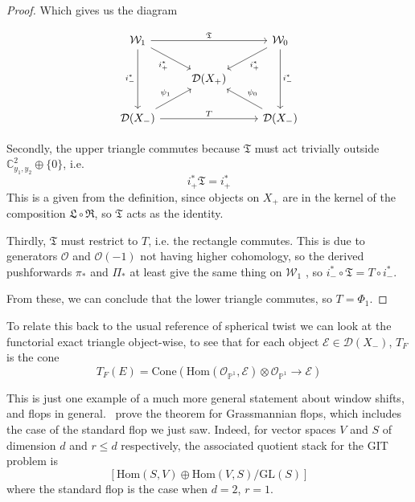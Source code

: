\begin{proof}
Which gives us the diagram

\[\begin{tikzcd}
	{\mathcal{W}_1} && {\mathcal{W}_0} \\
	& {\mathcal{D}(X_+ )} \\
	{\mathcal{D}(X_- )} && {\mathcal{D}(X_- )}
	\arrow["{\mathfrak T}", from=1-1, to=1-3]
	\arrow["{i_+^*}"', from=1-1, to=2-2]
	\arrow["{i_- ^*}"', from=1-1, to=3-1]
	\arrow["{i_+^*}", from=1-3, to=2-2]
	\arrow["{i_- ^*}", from=1-3, to=3-3]
	\arrow["{\psi_1}", from=3-1, to=2-2]
	\arrow["T", from=3-1, to=3-3]
	\arrow["{\psi_0}"', from=3-3, to=2-2]
\end{tikzcd}\]

Secondly, the upper triangle commutes because $\mathfrak{T}$ must act trivially outside $\mathbb{C}^{2}_{y_{1},y_{2}}\oplus \{ 0 \}$, i.e. $$
i^{*}_{+}\mathfrak{T} = i^{*}_{+}
$$This is a given from the definition, since objects on $X_+$ are in the kernel of the composition $\mathfrak{L}\circ\mathfrak{R}$, so $\mathfrak{T}$ acts as the identity. 

Thirdly,  $\mathfrak{T}$ must restrict to $T$, i.e. the rectangle commutes. This is due to generators $\mathcal{O}$ and $\mathcal{O}(-1)$ not having higher cohomology, so the derived pushforwards $\pi_{*}$ and $\Pi_{*}$ at least give the same thing on $\mathcal{W}_1$ , so $i_{-}^{*}\circ \mathfrak{T} = T\circ i_{-}^{*}$. 

From these, we can conclude that the lower triangle commutes, so $T = \Phi_1$. 
\end{proof}

To relate this back to the usual reference of spherical twist we can look at the functorial exact triangle object-wise, to see that for each object $\mathcal{E}\in \mathcal{D}(X_-)$, $T_F$ is the cone $$
T_{F}(E) = \mathrm{Cone}\left( \mathrm{Hom}(\mathcal{O}_{\mathbb{P}^{1}},\mathcal{E}) \otimes  \mathcal{O}_{\mathbb{P}^{1}} \to \mathcal{E}\right) 
$$ 

\begin{remark}{}{}
	This is just one example of a much more general statement about window shifts, and flops in general.~\cite*{donovan_window_2014} prove the theorem for Grassmannian flops, which includes the case of the standard flop we just saw. Indeed, for  vector spaces $V$ and $S$ of dimension $d$ and $r \leq d$ respectively, the associated quotient stack for the GIT problem is $$
	\left[ \mathrm{Hom} (S,V) \oplus \mathrm{Hom}(V,S)/\mathrm{GL}(S) \right] 
	$$where the standard flop is the case when $d = 2$, $r=1$.
	\end{remark}

